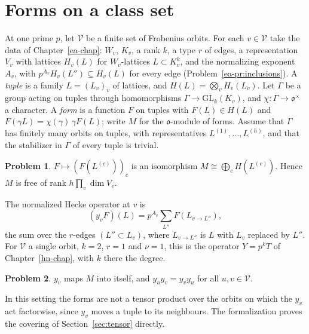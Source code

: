 \documentclass[reqno]{amsart}
\newcounter{chap}
\theoremstyle{definition}
\newtheorem{problem}{Problem}[section]
\theoremstyle{plain}
\theoremstyle{remark}
\newcommand{\GL}{\mathrm{GL}}
\newcommand{\vo}{\mathfrak o}
\newcommand{\Vc}{\mathcal V}
\begin{document}
\section{Forms on a class set}\label{sec:forms}

At one prime \(p\), let \(\Vc\) be a finite set of Frobenius orbits.  For each \(v\in\Vc\) take the data of Chapter~\ref{ea-chap}: \(W_v\), \(K_v\), a rank \(k\), a type \(r\) of edges, a representation \(V_v\) with lattices \(H_v(L)\) for \(W_v\)-lattices \(L\subset K_v^k\), and the normalizing exponent \(A_v\), with \(p^{A_v}H_v(L'')\subseteq H_v(L)\) for every edge (Problem~\ref{ea-pr:inclusions}).  A \emph{tuple} is a family \(L=(L_v)_v\) of lattices, and \(H(L)=\bigotimes_vH_v(L_v)\).  Let \(\Gamma\) be a group acting on tuples through homomorphisms \(\Gamma\to\GL_k(K_v)\), and \(\chi\colon\Gamma\to\vo^\times\) a character.  A \emph{form} is a function \(F\) on tuples with \(F(L)\in H(L)\) and \(F(\gamma L)=\chi(\gamma)\,\gamma F(L)\); write \(M\) for the \(\vo\)-module of forms.  Assume that \(\Gamma\) has finitely many orbits on tuples, with representatives \(L^{(1)},\dots,L^{(h)}\), and that the stabilizer in \(\Gamma\) of every tuple is trivial.

\begin{problem}\label{pr:delta}
\(F\mapsto(F(L^{(c)}))_c\) is an isomorphism \(M\cong\bigoplus_cH(L^{(c)})\).  Hence \(M\) is free of rank \(h\prod_v\dim V_v\).
\end{problem}

The normalized Hecke operator at \(v\) is
\[
 (y_vF)(L)=p^{A_v}\sum_{L''}F(L_{v\to L''}),
\]
the sum over the \(r\)-edges \((L''\subset L_v)\), where \(L_{v\to L''}\) is \(L\) with \(L_v\) replaced by \(L''\).  For \(\Vc\) a single orbit, \(k=2\), \(r=1\) and \(\nu=1\), this is the operator \(Y=p^kT\) of Chapter~\ref{hn-chap}, with \(k\) there the degree.

\begin{problem}\label{pr:hecke}
\(y_v\) maps \(M\) into itself, and \(y_uy_v=y_vy_u\) for all \(u,v\in\Vc\).
\end{problem}

In this setting the forms are not a tensor product over the orbits on which the \(y_v\) act factorwise, since \(y_v\) moves a tuple to its neighbours.  The formalization proves the covering of Section~\ref{sec:tensor} directly.
\end{document}
